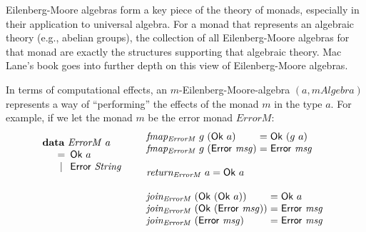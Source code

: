\documentclass{jfp1}
\newcommand{\kw}[1]{\textbf{#1}}
\begin{document}
Eilenberg-Moore algebras form a key piece of the theory of monads,
especially in their application to universal algebra. For a monad that
represents an algebraic theory (e.g., abelian groups), the collection
of all Eilenberg-Moore algebras for that monad are exactly the
structures supporting that algebraic theory. Mac Lane's book
\cite{maclane98} goes into further depth on this view of
Eilenberg-Moore algebras.

In terms of computational effects, an $m$-Eilenberg-Moore-algebra $(a,
\mathit{mAlgebra})$ represents a way of ``performing'' the effects of
the monad $m$ in the type $a$. For example, if we let the monad $m$ be the
error monad $\mathit{ErrorM}$:
\begin{displaymath}
  \begin{array}{ll}
    \begin{array}[t]{l}
      \kw{data}~\mathit{ErrorM}~a \\
      \quad
      \begin{array}{c@{\hspace{0.5em}}l}
        = & \mathsf{Ok}~a \\
        | & \mathsf{Error}~\mathit{String}
      \end{array}
    \end{array}
    &
    \begin{array}[t]{l}
      \begin{array}{@{}l@{\hspace{0.3em}}l@{\hspace{0.3em}}l@{\hspace{0.3em}}c@{\hspace{0.3em}}l}
        \mathit{fmap_{ErrorM}}&g&(\mathsf{Ok}~a) &=& \mathsf{Ok}~(g~a) \\
        \mathit{fmap_{ErrorM}}&g&(\mathsf{Error}~\mathit{msg}) &=& \mathsf{Error}~\mathit{msg} \\
      \end{array} \\
      \\
      \mathit{return_{ErrorM}}~a = \mathsf{Ok}~a \\
      \\
      \begin{array}{@{}l@{\hspace{0.3em}}l@{\hspace{0.3em}}c@{\hspace{0.3em}}l}
        \mathit{join_{ErrorM}}&(\mathsf{Ok}~(\mathsf{Ok}~a)) &=& \mathsf{Ok}~a \\
        \mathit{join_{ErrorM}}&(\mathsf{Ok}~(\mathsf{Error}~\mathit{msg})) &=& \mathsf{Error}~\mathit{msg} \\
        \mathit{join_{ErrorM}}&(\mathsf{Error}~\mathit{msg}) &=& \mathsf{Error}~\mathit{msg}
      \end{array}
    \end{array}
  \end{array}
\end{displaymath}
\end{document}
